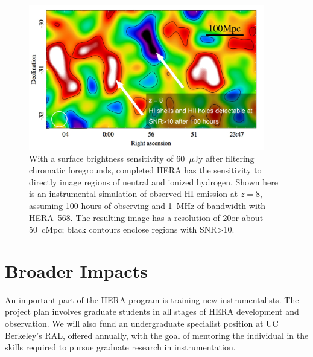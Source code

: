 \documentclass[preprint]{aastex}
\def\HI{{H{\small I }}}
\begin{document}
\begin{figure}[t] \centering
\includegraphics[height=2.5in]{plots/HERA_z8_SNR_wide_annotated.jpg}
\caption{\small 
With a surface brightness sensitivity of 60~$\mu$Jy after filtering chromatic
foregrounds, completed HERA has the sensitivity
to directly image regions of neutral and ionized hydrogen.
Shown here is an instrumental simulation of observed \HI emission at $z=8$,
assuming 100 hours of observing and 1~MHz of bandwidth with HERA~568.  The resulting
image has a resolution of 20\arcmin or about 50~cMpc; black contours
enclose regions with SNR>10.
\label{imaging}}
\end{figure}


\vspace{-0.25in}
\section{Broader Impacts}
\label{BIsec}

An important part of the HERA program is training new
instrumentalists.  The project plan involves graduate students in all
stages of HERA development and observation. We will also fund an
undergraduate specialist position
at UC Berkeley's RAL, offered annually, with the goal of
mentoring the individual in the skills required to pursue graduate
research in instrumentation.
\end{document}
